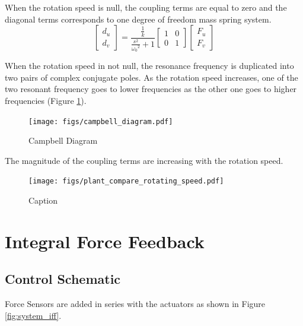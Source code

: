 \documentclass{ISMA_USD2020}
\begin{document}
When the rotation speed is null, the coupling terms are equal to zero and the diagonal terms corresponds to one degree of freedom mass spring system.
\begin{equation}
\label{eq:coupled_plant_no_rot}
\begin{bmatrix} d_u \\ d_v \end{bmatrix} =
\frac{\frac{1}{k}}{\frac{s^2}{{\omega_0}^2} + 1}
\begin{bmatrix}
  1 & 0 \\
  0 & 1
\end{bmatrix}
\begin{bmatrix} F_u \\ F_v \end{bmatrix}
\end{equation}

When the rotation speed in not null, the resonance frequency is duplicated into two pairs of complex conjugate poles.
As the rotation speed increases, one of the two resonant frequency goes to lower frequencies as the other one goes to higher frequencies (Figure \ref{fig:campbell_diagram}).

\begin{figure}[htbp]
\centering
\texttt{[image: figs/campbell\_diagram.pdf]}
\caption{\label{fig:campbell_diagram}Campbell Diagram}
\end{figure}

The magnitude of the coupling terms are increasing with the rotation speed.

\begin{figure}[htbp]
\centering
\texttt{[image: figs/plant\_compare\_rotating\_speed.pdf]}
\caption{\label{fig:plant_compare_rotating_speed}Caption}
\end{figure}

\section{Integral Force Feedback}
\label{sec:orgc6c1b99}
\subsection{Control Schematic}
\label{sec:orgb93b297}

Force Sensors are added in series with the actuators as shown in Figure \ref{fig:system_iff}.
\end{document}
